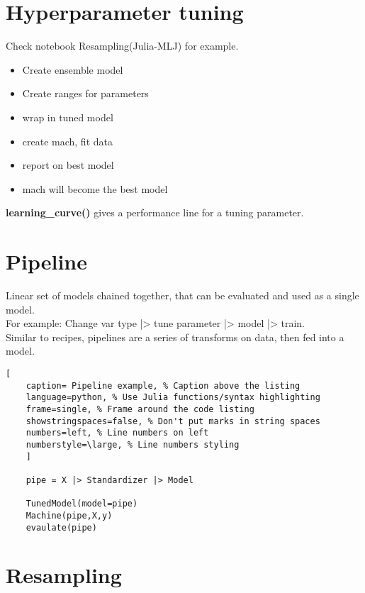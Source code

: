 \documentclass[11pt]{scrartcl} %
\begin{document}
\section{Hyperparameter tuning}

Check notebook Resampling(Julia-MLJ) for example.

\begin{itemize}
	\item Create ensemble model
	\item Create ranges for parameters
	\item wrap in tuned model
	\item create mach, fit data
	\item report on best model
	\item mach will become the best model
\end{itemize}

\textbf{learning\_curve()} gives a performance line for a tuning parameter. 

\section{Pipeline}

Linear set of models chained together, that can be evaluated and used as a single model.\\

For example: Change var type |> tune parameter |> model |> train.\\

Similar to recipes, pipelines are a series of transforms on data, then fed into a model.

\begin{lstlisting}[
	caption= Pipeline example, % Caption above the listing
	language=python, % Use Julia functions/syntax highlighting
	frame=single, % Frame around the code listing
	showstringspaces=false, % Don't put marks in string spaces
	numbers=left, % Line numbers on left
	numberstyle=\large, % Line numbers styling
	]

	pipe = X |> Standardizer |> Model

	TunedModel(model=pipe)
	Machine(pipe,X,y)
	evaulate(pipe)

\end{lstlisting}

\section{Resampling}
\end{document}
